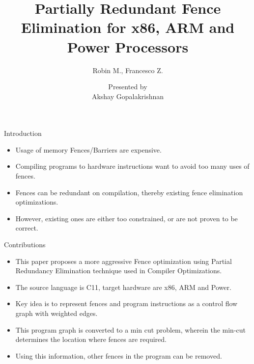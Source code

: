 \documentclass[notes, xcolor=dvipsnames]{beamer}
\title{Partially Redundant Fence Elimination for x86, ARM and Power Processors}
\subtitle{Robin M., Francesco Z.}
\author{Presented by \\ Akshay Gopalakrishnan}
\begin{document}
    \begin{frame}
        
        \maketitle

    \end{frame}


    \begin{frame}{Introduction}

        \begin{itemize}
            \item Usage of memory Fences/Barriers are expensive. 
            \item Compiling programs to hardware instructions want to avoid too many uses of fences.
            \item Fences can be redundant on compilation, thereby existing fence elimination optimizations.
            \item However, existing ones are either too constrained, or are not proven to be correct. 
        \end{itemize}
        
    \end{frame}

    \begin{frame}{Contributions}

        \begin{itemize}
            \item This paper proposes a more aggressive Fence optimization using Partial Redundancy Elimination technique used in Compiler Optimizations.
            \item The source language is C11, target hardware are x86, ARM and Power.
            \item Key idea is to represent fences and program instructions as a control flow graph with weighted edges.  
            \item This program graph is converted to a min cut problem, wherein the min-cut determines the location where fences are required.
            \item Using this information, other fences in the program can be removed.
        \end{itemize}
        
    \end{frame}
\end{document}
